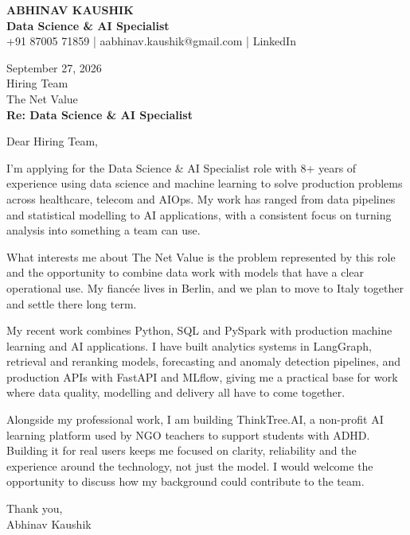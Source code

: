 \documentclass[10pt,a4paper]{article}
\begin{document}
\begin{center}
{\Large\bfseries ABHINAV KAUSHIK}\\[2pt]
{\bfseries Data Science \& AI Specialist}\\[2pt]
+91 87005 71859 \quad | \quad aabhinav.kaushik@gmail.com \quad | \quad LinkedIn
\end{center}
\vspace{8pt}
September 27, 2026\\[6pt]
Hiring Team\\
The Net Value\\[4pt]
\textbf{Re: Data Science \& AI Specialist}

Dear Hiring Team,

I’m applying for the Data Science \& AI Specialist role with 8+ years of experience using data science and machine learning to solve production problems across healthcare, telecom and AIOps. My work has ranged from data pipelines and statistical modelling to AI applications, with a consistent focus on turning analysis into something a team can use.

What interests me about The Net Value is the problem represented by this role and the opportunity to combine data work with models that have a clear operational use. My fiancée lives in Berlin, and we plan to move to Italy together and settle there long term.

My recent work combines Python, SQL and PySpark with production machine learning and AI applications. I have built analytics systems in LangGraph, retrieval and reranking models, forecasting and anomaly detection pipelines, and production APIs with FastAPI and MLflow, giving me a practical base for work where data quality, modelling and delivery all have to come together.

Alongside my professional work, I am building ThinkTree.AI, a non-profit AI learning platform used by NGO teachers to support students with ADHD. Building it for real users keeps me focused on clarity, reliability and the experience around the technology, not just the model. I would welcome the opportunity to discuss how my background could contribute to the team.

Thank you,\\
Abhinav Kaushik
\end{document}
